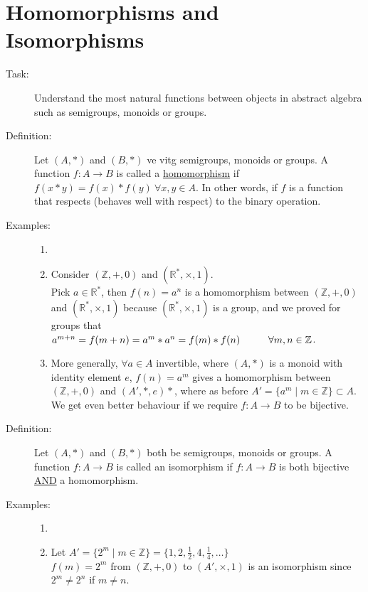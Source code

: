 \documentclass[10pt]{article}
\begin{document}
	\section{Homomorphisms and Isomorphisms}
	\begin{description}
		\item[Task:] Understand the most natural functions between objects in abstract algebra such as semigroups, monoids or groups.
		\item[Definition:] Let $(A, *)$ and $(B, *)$ ve vitg semigroups, monoids or groups. A function $f: A \rightarrow B$ is called a \underline{homomorphism} if $f(x * y) = f(x) * f(y) \: \forall x, y \in A$. In other words, if $f$ is a function that respects (behaves well with respect) to the binary operation.
		\item[Examples:]
		\begin{enumerate}
			\item[]
			\item Consider $(\mathbb{Z}, +, 0)$ and $(\mathbb{R}^*, \times, 1)$. \\
			Pick $a \in \mathbb{R}^*$, then $f(n) = a^n$ is a homomorphism between $(\mathbb{Z}, +, 0)$ and $(\mathbb{R}^*, \times, 1)$ because $(\mathbb{R}^*, \times, 1)$ is a group, and we proved for groups that $a^{m+n} = f(m+n) = a^m * a^n = f(m) * f(n) \hspace{10mm} \forall m, n \in \mathbb{Z}$.
			\item More generally, $\forall a \in A$ invertible, where $(A, *)$ is a monoid with identity element $e$, $f(n) = a^m$ gives a homomorphism between $(\mathbb{Z}, +, 0)$ and $(A', *, e)*$, where as before $A' = \{a^m \mid m \in \mathbb{Z}\} \subset A$. \\
			We get even better behaviour if we require $f:A \rightarrow B$ to be bijective.
		\end{enumerate}
		\item[Definition:] Let $(A, *)$ and $(B, *)$ both be semigroups, monoids or groups. A function $f:A \rightarrow B$ is called an isomorphism if  $f:A \rightarrow B$ is both bijective \underline{AND} a homomorphism.
		\item[Examples:]
		\begin{enumerate}
			\item[]
			\item Let $A' = \{2^m \mid m \in \mathbb{Z}\} = \{1, 2, \frac{1}{2}, 4, \frac{1}{4}, \dots\}$ \\
			$f(m) = 2^m$ from $(\mathbb{Z}, +, 0)$ to $(A', \times, 1)$ is an isomorphism since $2^m \neq 2^n$ if $m \neq n$.

\end{enumerate}
\end{description}
\end{document}
